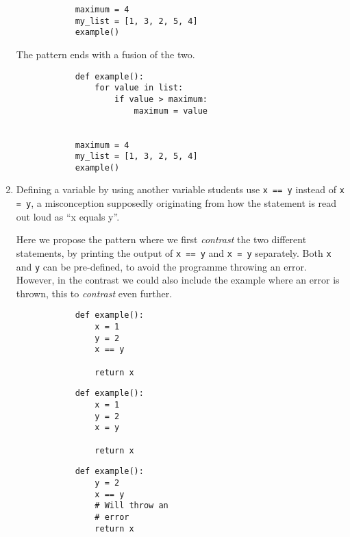 \begin{enumerate}
\begin{verbatim}
            maximum = 4
            my_list = [1, 3, 2, 5, 4]
            example()
        \end{verbatim}

\hfill

      The pattern ends with a fusion of the two.

        \hfill

        \begin{verbatim}
            def example():
                for value in list:
                    if value > maximum:
                        maximum = value


            maximum = 4
            my_list = [1, 3, 2, 5, 4]
            example()
        \end{verbatim}

\hfill
    
    \item Defining a variable by using another variable students use 
      \texttt{x == y} instead of \texttt{x = y}, a 
      misconception supposedly originating from how the statement is read 
out 
      loud as \enquote{x equals y}.

      Here we propose the pattern where we first \emph{contrast} the two 
different statements, by printing the output of \texttt{x 
== y} and \texttt{x = y} separately. Both \texttt{x} and \texttt{y} can be pre-defined, to avoid 
the programme throwing an error. However, in the contrast we could 
also include the example where an error is thrown, this to \emph{
contrast} even further. 

      \hfill
     \begin{minipage}[t]{0.3\columnwidth}
        \begin{verbatim}
            def example():
                x = 1
                y = 2
                x == y
    
                return x
        \end{verbatim}
    \end{minipage}
\hfill
    \begin{minipage}[t]{0.3\columnwidth}
        \begin{verbatim}
            def example():
                x = 1
                y = 2
                x = y
                
                return x
        \end{verbatim}
    \end{minipage}
\hfill
    \begin{minipage}[t]{0.3\columnwidth}
        \begin{verbatim}
            def example():
                y = 2
                x == y 
                # Will throw an 
                # error
                return x
        \end{verbatim}
    \end{minipage}
\hfill
    

\end{enumerate}
